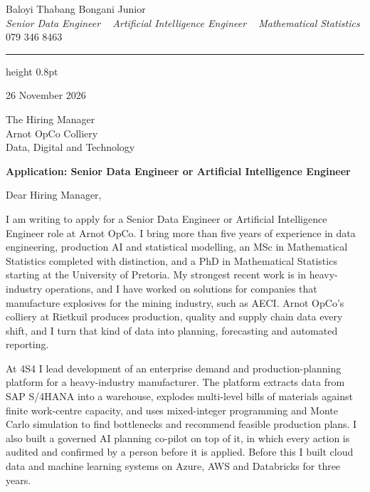 \documentclass[a4paper,11pt]{article}
\begin{document}
\begin{center}
    {\huge Baloyi Thabang Bongani Junior} \\ \vspace{2pt}
    {\large\textit{Senior Data Engineer \textbar~ Artificial Intelligence Engineer \textbar~ Mathematical Statistics}} \\ \vspace{4pt}
    {079 346 8463} ~\textbar~
    \href{mailto:Baloyibongani1@gmail.com}{\color{blue}{Baloyibongani1@gmail.com}} ~\textbar~
    \href{https://www.linkedin.com/in/thabang-bongani-junior-baloyi-2622b0286/}{\color{blue}{LinkedIn}} ~\textbar~
    \href{https://github.com/thabangTheActuaryCoder}{\color{blue}{GitHub}}
\end{center}
{\color{airforceblue}\hrule height 0.8pt}

\vspace{6pt}
26 November 2026

The Hiring Manager \\
Arnot OpCo Colliery \\
Data, Digital and Technology

\textbf{Application: Senior Data Engineer or Artificial Intelligence Engineer}

Dear Hiring Manager,

I am writing to apply for a Senior Data Engineer or Artificial Intelligence Engineer role at
Arnot OpCo. I bring more than five years of experience in data engineering, production AI and
statistical modelling, an MSc in Mathematical Statistics completed with distinction, and a PhD in
Mathematical Statistics starting at the University of Pretoria. My strongest recent work is in
heavy-industry operations, and I have worked on solutions for companies that manufacture explosives
for the mining industry, such as AECI. Arnot OpCo's colliery at Rietkuil produces production, quality and supply chain data every shift, and I turn that kind of data into planning, forecasting and automated reporting.

At 4S4 I lead development of an enterprise demand and production-planning platform for a
heavy-industry manufacturer. The platform extracts data from SAP S/4HANA into a warehouse, explodes multi-level
bills of materials against finite work-centre capacity, and uses mixed-integer programming
and Monte Carlo simulation to find bottlenecks and recommend feasible production plans. I also built a governed AI planning co-pilot on top
of it, in which every action is audited and confirmed by a person before it is applied. Before this I
built cloud data and machine learning systems on Azure, AWS and Databricks for three years.
\end{document}
